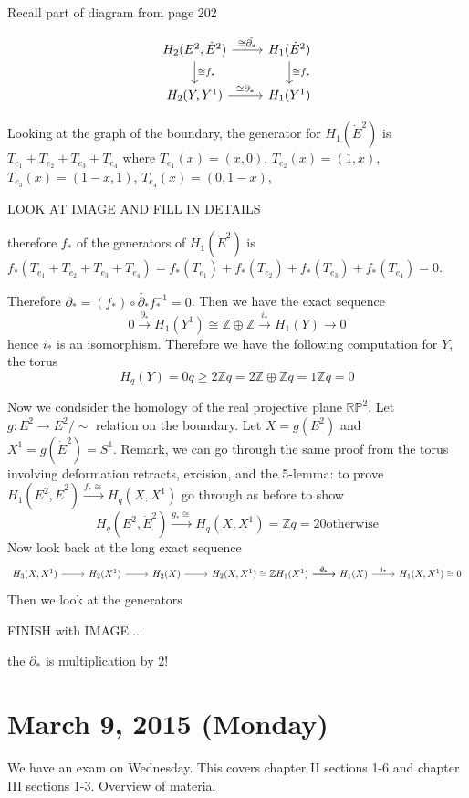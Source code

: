 \documentclass{article}
\begin{document}
Recall part of diagram from page 202

\[
\begin{tikzcd}
H_2(E^2, \dot{E}^2) \arrow[r, "\cong \tilde{\partial_*}"] \arrow[d, "\cong f_*"] &  H_1(\dot{E}^2) \arrow[d, "\cong f_*"] \\
H_2(Y, Y^1) \arrow[r, "\cong \partial_*"] & H_1(Y^1)
\end{tikzcd}
\]

Looking at the graph of the boundary, the generator for $H_1(\dot{E}^2)$ is $T_{e_1} + T_{e_2} + T_{e_3} + T_{e_4}$ where $T_{e_1}(x) = (x,0)$, $T_{e_2}(x) = (1,x)$, $T_{e_3}(x) = (1-x,1)$, $T_{e_4}(x) = (0, 1-x)$,

LOOK AT IMAGE AND FILL IN DETAILS

therefore $f_*$ of the generators of $H_1(\dot{E}^2)$ is $f_*(T_{e_1} + T_{e_2} + T_{e_3} + T_{e_4}) = f_*(T_{e_1}) + f_*(T_{e_2}) + f_*(T_{e_3}) + f_*(T_{e_4}) = 0$.

Therefore $\partial_* = (f_*) \circ \tilde{\partial_*} f_*^{-1} = 0$. Then we have the exact sequence
\[
0 \xrightarrow{\partial_*} H_1(Y^1) \cong \mathbb{Z} \oplus \mathbb{Z} \xrightarrow{i_*} H_1(Y) \to 0
\]
hence $i_*$ is an isomorphism. Therefore we have the following computation for $Y$, the torus
\[
H_q(Y) = 0 q \geq 2 \mathbb{Z} q = 2 \mathbb{Z} \oplus \mathbb{Z} q=1 \mathbb{Z} q = 0
\]

Now we condsider the homology of the real projective plane $\mathbb{RP}^2$. Let $g: E^2 \to E^2/\sim$ relation on the boundary. Let $X = g(E^2)$ and $X^1 = g(\dot{E}^2) = S^1$. Remark, we can go through the same proof from the torus involving deformation retracts, excision, and the 5-lemma: to prove $H_1(E^2, \dot{E}^2) \xrightarrow{f_* \cong} H_q(X, X^1)$ go through as before to show
\[
H_q(E^2, \dot{E}^2) \xrightarrow{g_* \cong} H_q(X, X^1) = \mathbb{Z} q = 2 0 \text{otherwise}
\]
Now look back at the long exact sequence
\[
\begin{tikzcd}
H_3(X, X^1) \arrow[r] & H_2(X^1) \arrow[r] & H_2(X) \arrow[r] & H_2(X, X^1)\cong \mathbb{Z} \arrow[r, "\partial_*"] H_1(X^1) \arrow[r, "i_*"] & H_1(X) \arrow[r, "j_*"] & H_1(X, X^1) \cong 0
\end{tikzcd}
\]
Then we look at the generators

FINISH with IMAGE....

the $\partial_*$ is multiplication by 2!

\section{March 9, 2015 (Monday)}
We have an exam on Wednesday. This covers chapter II sections 1-6 and chapter III sections 1-3.
Overview of material
\end{document}
